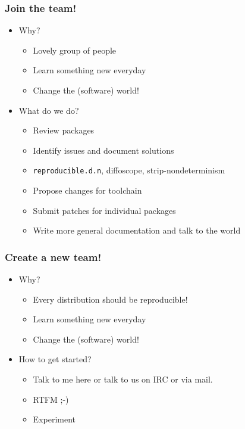 \documentclass[14pt]{beamer}
\begin{document}
\begin{frame}
 \frametitle{Join the team!}

 \begin{itemize}
  \item Why?
   \begin{itemize}
    \item \heartsuit{}\heartsuit{}\heartsuit{} Lovely group of people \heartsuit{}\heartsuit{}\heartsuit{}
    \item Learn something new everyday
    \item Change the (software) world!
   \end{itemize}
  \item What do we do?
   \begin{itemize}
    \item Review packages
    \item Identify issues and document solutions
    \item \texttt{reproducible.d.n}, diffoscope, strip-nondeterminism
    \item Propose changes for toolchain
    \item Submit patches for individual packages
    \item Write more general documentation and  talk to the world
   \end{itemize}
 \end{itemize}
\end{frame}

\begin{frame}
 \frametitle{Create a new team!}

 \begin{itemize}
  \item Why?
   \begin{itemize}
    \item Every distribution should be reproducible!
    \item Learn something new everyday
    \item Change the (software) world!
   \end{itemize}
  \item How to get started?
   \begin{itemize}
    \item Talk to me here or talk to us on IRC or via mail.
    \item RTFM ;-)
    \item Experiment
   \end{itemize}
 \end{itemize}
\end{frame}
\end{document}
